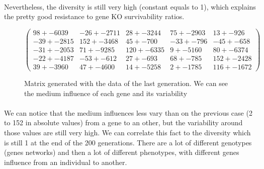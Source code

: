 \documentclass[]{report} %
\begin{document}
    \paragraph*{}
    Nevertheless, the diversity is still very high (constant equals to 1), which explains the pretty good resistance to gene KO survivability ratios.
   

    \begin{figure}[H] 
            \centering
            \small
    $
            \begin{pmatrix}
                98 +- 6039 & -26 +- 2711 & 28 +- 3244 & 75 +- 2903 & 13 +- 926 \\
                -39 +- 2815 & 152 +- 3468 & 45 +- 700 & -33 +- 796 & -45 +- 658 \\
                -31 +- 2053 & 71 +- 9285 & 120 +- 6335 & 9 +- 5160 & 80 +- 6374 \\
                -22 +- 4187 & -53 +- 612 & 27 +- 693 & 68 +- 785 & 152 +- 2428 \\
                39 +- 3960 & 47 +- 4600 & 14 +- 5258 & 2 +- 1785 & 116 +- 1672 
            \end{pmatrix}
    $
            \caption{\footnotesize Matrix generated with the data of the last generation. We can see the medium influence of each gene and its variability}
            \label{mat:ps300xg200xmr1-10-1}
    \end{figure}
    \paragraph*{}
     We can notice that the medium influences less vary than on the previous case (2 to 152 in absolute values) from a gene to an other, but the variability around those values are still very high. We can correlate this fact to the diversity which is still 1 at the end of the 200 generations. There are a lot of different genotypes (genes networks) and then a lot of different phenotypes, with different genes influence from an individual to another.
    
    
    \newpage
\end{document}
